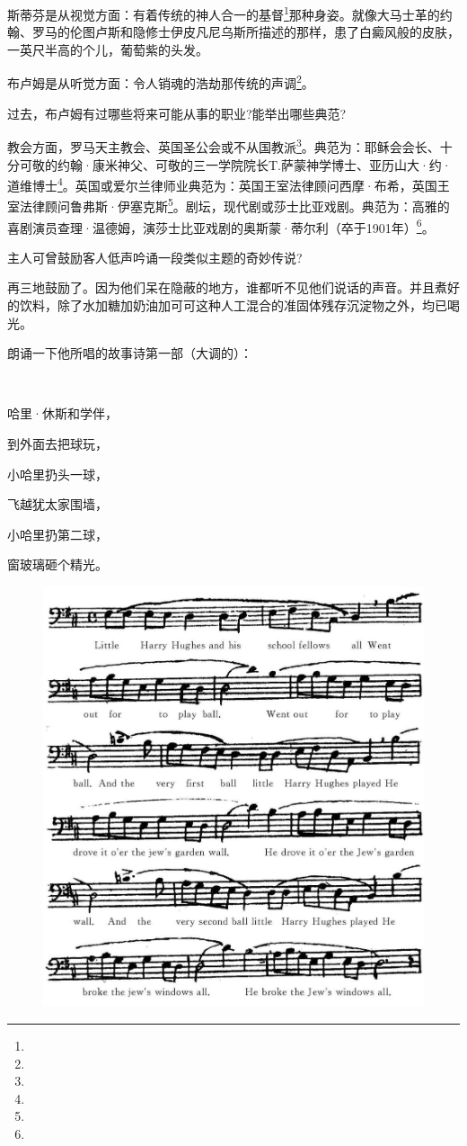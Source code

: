 \par 斯蒂芬是从视觉方面：有着传统的神人合一的基督\footnote{}那种身姿。就像大马士革的约翰、罗马的伦图卢斯和隐修士伊皮凡尼乌斯所描述的那样，患了白癜风般的皮肤，一英尺半高的个儿，葡萄紫的头发。
\par 布卢姆是从听觉方面：令人销魂的浩劫那传统的声调\footnote{}。
\par 过去，布卢姆有过哪些将来可能从事的职业?能举出哪些典范?
\par 教会方面，罗马天主教会、英国圣公会或不从国教派\footnote{}。典范为：耶稣会会长、十分可敬的约翰·康米神父、可敬的三一学院院长T.萨蒙神学博士、亚历山大·约·道维博士\footnote{}。英国或爱尔兰律师业典范为：英国王室法律顾问西摩·布希，英国王室法律顾问鲁弗斯·伊塞克斯\footnote{}。剧坛，现代剧或莎士比亚戏剧。典范为：高雅的喜剧演员查理·温德姆，演莎士比亚戏剧的奥斯蒙·蒂尔利（卒于1901年）\footnote{}。
\par 主人可曾鼓励客人低声吟诵一段类似主题的奇妙传说?
\par 再三地鼓励了。因为他们呆在隐蔽的地方，谁都听不见他们说话的声音。并且煮好的饮料，除了水加糖加奶油加可可这种人工混合的准固体残存沉淀物之外，均已喝光。
\par 朗诵一下他所唱的故事诗第一部（大调的）：
\par  
\par 哈里·休斯和学伴，
\par 到外面去把球玩，
\par 小哈里扔头一球，
\par 飞越犹太家围墙，
\par 小哈里扔第二球，
\par 窗玻璃砸个精光。

\begin{figure}[htb]
    \includegraphics[scale=0.4]{picture/尤利西斯2.jpeg}
\end{figure}

